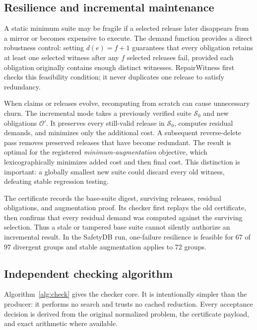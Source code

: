 \documentclass[10pt,conference]{IEEEtran}
\newcommand{\Obl}{\mathcal{O}}
\newcommand{\Suit}{\mathcal{S}}
\begin{document}
\subsection{Resilience and incremental maintenance}
A static minimum suite may be fragile if a selected release later disappears from a mirror or becomes expensive to execute. The demand function provides a direct robustness control: setting $d(e)=f+1$ guarantees that every obligation retains at least one selected witness after any $f$ selected releases fail, provided each obligation originally contains enough distinct witnesses. RepairWitness first checks this feasibility condition; it never duplicates one release to satisfy redundancy.

When claims or releases evolve, recomputing from scratch can cause unnecessary churn. The incremental mode takes a previously verified suite $\Suit_0$ and new obligations $\Obl'$. It preserves every still-valid release in $\Suit_0$, computes residual demands, and minimizes only the additional cost. A subsequent reverse-delete pass removes preserved releases that have become redundant. The result is optimal for the registered \emph{minimum-augmentation} objective, which lexicographically minimizes added cost and then final cost. This distinction is important: a globally smallest new suite could discard every old witness, defeating stable regression testing.

The certificate records the base-suite digest, surviving releases, residual obligations, and augmentation proof. Its checker first replays the old certificate, then confirms that every residual demand was computed against the surviving selection. Thus a stale or tampered base suite cannot silently authorize an incremental result. In the SafetyDB run, one-failure resilience is feasible for 67 of 97 divergent groups and stable augmentation applies to 72 groups.

\subsection{Independent checking algorithm}
Algorithm~\ref{alg:check} gives the checker core. It is intentionally simpler than the producer: it performs no search and trusts no cached reduction. Every acceptance decision is derived from the original normalized problem, the certificate payload, and exact arithmetic where available.
\end{document}
